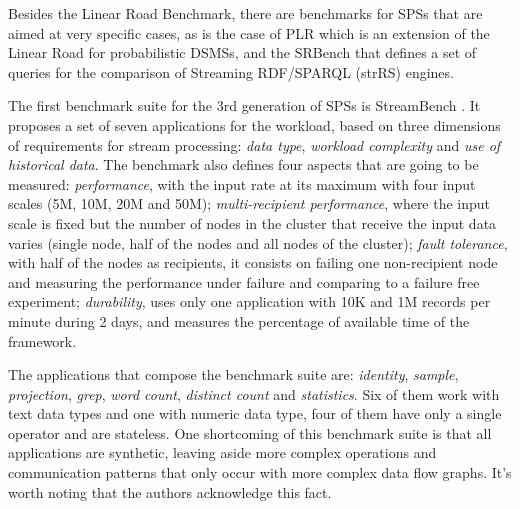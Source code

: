 \documentclass[ppgc,diss,english]{iiufrgs}
\begin{document}
Besides the Linear Road Benchmark, there are benchmarks for SPSs that are aimed at very specific cases, as is the case of PLR \cite{karachi2012plr} which is an extension of the Linear Road for probabilistic DSMSs, and the SRBench \cite{zhang2012srbench} that defines a set of queries for the comparison of Streaming RDF/SPARQL (strRS) engines.



The first benchmark suite for the 3rd generation of SPSs is StreamBench \cite{lu2014stream}. It proposes a set of seven applications for the workload, based on three dimensions of requirements for stream processing: \emph{data type}, \emph{workload complexity} and \emph{use of historical data}. The benchmark also defines four aspects that are going to be measured: \emph{performance}, with the input rate at its maximum with four input scales (5M, 10M, 20M and 50M); \emph{multi-recipient performance}, where the input scale is fixed but the number of nodes in the cluster that receive the input data varies (single node, half of the nodes and all nodes of the cluster); \emph{fault tolerance}, with half of the nodes as recipients, it consists on failing one non-recipient node and measuring the performance under failure and comparing to a failure free experiment; \emph{durability}, uses only one application with 10K and 1M records per minute during 2 days, and measures the percentage of available time of the framework.

The applications that compose the benchmark suite are: \emph{identity}, \emph{sample}, \emph{projection}, \emph{grep}, \emph{word count}, \emph{distinct count} and \emph{statistics}. Six of them work with text data types and one with numeric data type, four of them have only a single operator and are stateless. One shortcoming of this benchmark suite is that all applications are synthetic, leaving aside more complex operations and communication patterns that only occur with more complex data flow graphs. It's worth noting that the authors acknowledge this fact.
\end{document}
